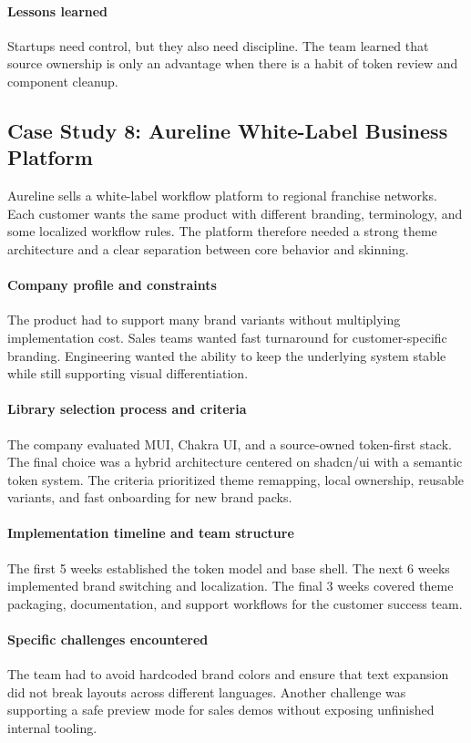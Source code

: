 \paragraph{Lessons learned}
Startups need control, but they also need discipline. The team learned that source ownership is only an advantage when there is a habit of token review and component cleanup.

\subsection{Case Study 8: Aureline White-Label Business Platform}
Aureline sells a white-label workflow platform to regional franchise networks. Each customer wants the same product with different branding, terminology, and some localized workflow rules. The platform therefore needed a strong theme architecture and a clear separation between core behavior and skinning.

\paragraph{Company profile and constraints}
The product had to support many brand variants without multiplying implementation cost. Sales teams wanted fast turnaround for customer-specific branding. Engineering wanted the ability to keep the underlying system stable while still supporting visual differentiation.

\paragraph{Library selection process and criteria}
The company evaluated MUI, Chakra UI, and a source-owned token-first stack. The final choice was a hybrid architecture centered on shadcn/ui with a semantic token system. The criteria prioritized theme remapping, local ownership, reusable variants, and fast onboarding for new brand packs.

\paragraph{Implementation timeline and team structure}
The first 5 weeks established the token model and base shell. The next 6 weeks implemented brand switching and localization. The final 3 weeks covered theme packaging, documentation, and support workflows for the customer success team.

\paragraph{Specific challenges encountered}
The team had to avoid hardcoded brand colors and ensure that text expansion did not break layouts across different languages. Another challenge was supporting a safe preview mode for sales demos without exposing unfinished internal tooling.

